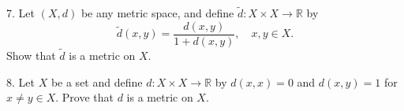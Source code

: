 \documentclass{article}
\theoremstyle{remark} %
\newcommand{\R}{{\mathbb{R}}}
\begin{document}



7. Let $(X,d)$ be any metric space, and define $\tilde d: X \times X \to \R$ by 
    \begin{equation*}
        \tilde d(x,y) = \frac{d(x,y)}{1+d(x,y)}, \quad x,y \in X .
    \end{equation*}
    Show that $\tilde d$ is a metric on $X$.

\vspace{11cm} %



8. Let $X$ be a set and define $d\colon X \times X \to \R$ by $d(x,x) = 0$ and $d(x,y)=1$ for $x\neq y \in X$. Prove that $d$ is a metric on $X$.%

\vspace{13cm} %





\end{document}
